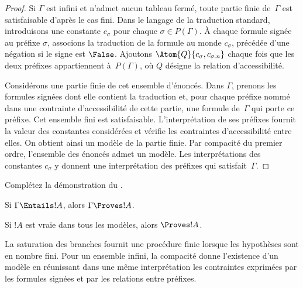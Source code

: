 \documentclass[../../../include/open-logic-section]{subfiles}
\begin{document}
\begin{proof}
Si $\Gamma$ est infini et n'admet aucun tableau fermé, toute
partie finie de~$\Gamma$ est satisfaisable d'après le cas fini.
Dans le langage de la traduction standard, introduisons une
constante $c_\sigma$ pour chaque $\sigma\in P(\Gamma)$. À
chaque formule signée au préfixe $\sigma$, associons la
traduction de la formule au monde $c_\sigma$, précédée d'une
négation si le signe est $\False$. Ajoutons
$\Atom{Q}{c_\sigma,c_{\sigma.n}}$ chaque fois que les deux
préfixes appartiennent à~$P(\Gamma)$, où $Q$ désigne la relation
d'accessibilité.

Considérons une partie finie de cet ensemble d'énoncés. Dans
$\Gamma$, prenons les formules signées dont elle contient la
traduction et, pour chaque préfixe nommé dans une contrainte
d'accessibilité de cette partie, une formule de~$\Gamma$ qui
porte ce préfixe. Cet ensemble fini est satisfaisable.
L'interprétation de ses préfixes fournit la valeur des
constantes considérées et vérifie les contraintes
d'accessibilité entre elles. On obtient ainsi un modèle de la
partie finie. Par compacité du premier ordre, l'ensemble des
énoncés admet un modèle. Les interprétations des constantes
$c_\sigma$ y donnent une interprétation des préfixes qui
satisfait~$\Gamma$.
\end{proof}

\begin{prob}
Complétez la démonstration du .
\end{prob}

\begin{cor}
Si $\Gamma \Entails !A$, alors $\Gamma \Proves !A$.
\end{cor}

\begin{cor}
Si $!A$ est vraie dans tous les modèles, alors $\Proves !A$.
\end{cor}
\begin{explain}
La saturation des branches fournit une procédure finie lorsque
les hypothèses sont en nombre fini. Pour un ensemble infini,
la compacité donne l'existence d'un modèle en réunissant dans
une même interprétation les contraintes exprimées par les
formules signées et par les relations entre préfixes.
\end{explain}
\end{document}
